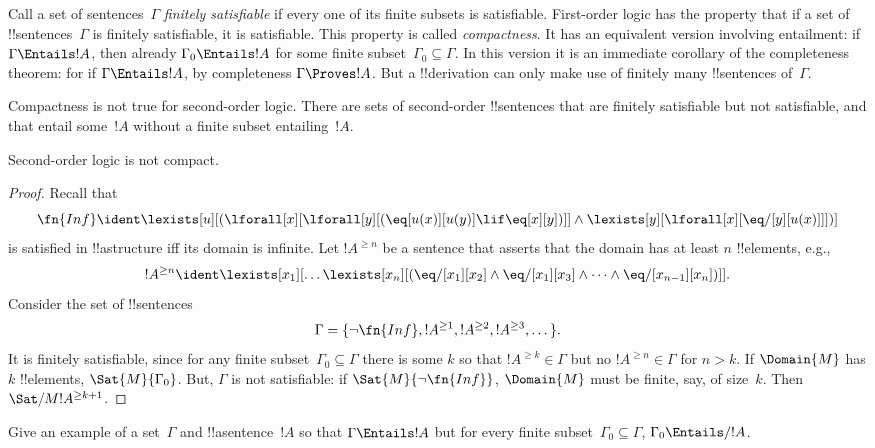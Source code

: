 \documentclass[../../../include/open-logic-section]{subfiles}
\begin{document}


\begin{explain}
Call a set of sentences~$\Gamma$ \emph{finitely satisfiable} if every
one of its finite subsets is satisfiable.  First-order logic has the
property that if a set of !!{sentence}s~$\Gamma$ is finitely
satisfiable, it is satisfiable.  This property is called
\emph{compactness}.  It has an equivalent version involving
entailment: if $\Gamma \Entails !A$, then already $\Gamma_0 \Entails
!A$ for some finite subset~$\Gamma_0 \subseteq \Gamma$. In this
version it is an immediate corollary of the completeness theorem: for
if $\Gamma \Entails !A$, by completeness $\Gamma \Proves !A$. But a
!!{derivation} can only make use of finitely many !!{sentence}s
of~$\Gamma$.

Compactness is not true for second-order logic. There are sets of
second-order !!{sentence}s that are finitely satisfiable but not
satisfiable, and that entail some~$!A$ without a finite subset
entailing~$!A$.  
\end{explain}


\begin{thm}
Second-order logic is not compact.
\end{thm}

\begin{proof}
Recall that 
\[
\fn{Inf} \ident \lexists[u][(\lforall[x][\lforall[y][(\eq[u(x)][u(y)]
      \lif \eq[x][y])]] \land \lexists[y][\lforall[x][\eq/[y][u(x)]]])]
\]
is satisfied in !!a{structure} iff its domain is infinite. Let
$!A^{\ge n}$ be a sentence that asserts that the domain has at least
$n$ !!{element}s, e.g.,
\[
!A^{\ge n} \ident \lexists[x_1][\dots\lexists[x_n][(\eq/[x_1][x_2]
    \land \eq/[x_1][x_3] \land \dots \land \eq/[x_{n-1}][x_n])]].
\]
Consider the set of !!{sentence}s
\[
\Gamma = \{\lnot \fn{Inf}, !A^{\ge 1}, !A^{\ge 2}, !A^{\ge 3}, \dots\}.
\]
It is finitely satisfiable, since for any finite subset~$\Gamma_0
\subseteq \Gamma$
there is some $k$ so that $!A^{\ge k} \in \Gamma$ but no $!A^{\ge n}
\in \Gamma$ for $n>k$. If $\Domain{M}$ has $k$ !!{element}s,
$\Sat{M}{\Gamma_0}$. But, $\Gamma$ is not satisfiable: if
$\Sat{M}{\lnot \fn{Inf}}$, $\Domain{M}$ must be finite, say, of
size~$k$. Then $\Sat/{M}{!A^{\ge k+1}}$.
\end{proof}

\begin{prob}
Give an example of a set~$\Gamma$ and !!a{sentence}~$!A$ so that
$\Gamma \Entails !A$ but for every finite subset~$\Gamma_0 \subseteq
\Gamma$, $\Gamma_0 \Entails/ !A$.
\end{prob}
\end{document}
